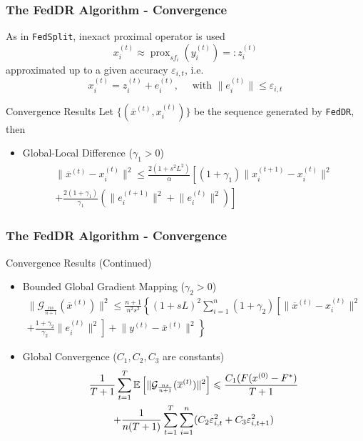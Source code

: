 \begin{frame}
\frametitle{The FedDR Algorithm - Convergence}

As in \texttt{FedSplit}, inexact proximal operator is used
$$x_i^{(t)} \approx \operatorname{prox}_{sf_i}(y_i^{(t)}) =: z_i^{(t)}$$
approximated up to a given accuracy $\varepsilon_{i,t}$, i.e.
$$x_i^{(t)} = z_i^{(t)} + e_i^{(t)}, \quad \text{ with } \lVert e_i^{(t)} \rVert \leqslant \varepsilon_{i,t}$$

\begin{block}{Convergence Results}
Let $\{ (\overline{x}^{(t)}, x_i^{(t)}) \}$ be the sequence generated by \texttt{FedDR}, then
\begin{itemize}
    \item Global-Local Difference ($\gamma_1 > 0$)
    {\smaller[2]
    \begin{multline*}
    \lVert \overline{x}^{(t)} - x_i^{(t)} \rVert^2 \leqslant \frac{2(1+s^2L^2)}{\alpha} \left[ (1+\gamma_1) \lVert x_i^{(t+1)} - x_i^{(t)} \rVert^2 \right. \\
    \left. + \frac{2(1+\gamma_1)}{\gamma_1}(\lVert e_i^{(t+1)} \rVert^2 + \lVert e_i^{(t)} \rVert^2) \right]
    \end{multline*}
    }
\end{itemize}
\end{block}

\end{frame}


\begin{frame}
\frametitle{The FedDR Algorithm - Convergence}

\begin{block}{Convergence Results (Continued)}
\begin{itemize}
    \item Bounded Global Gradient Mapping ($\gamma_2 > 0$)
    {\smaller[2]
    \begin{multline*}
    \lVert \mathcal{G}_{\frac{ns}{n+1}} (\overline{x}^{(t)}) \rVert^2 \leqslant \frac{n+1}{n^2s^2} \left\{ (1+sL)^2 \sum_{i=1}^n (1+\gamma_2) \left[ \lVert \overline{x}^{(t)} - x_i^{(t)} \rVert^2 \right. \right. \\
    \left. \left. + \frac{1+\gamma_2}{\gamma_2} \lVert e_i^{(t)} \rVert^2 \right] + \lVert y^{(t)} - \overline{x}^{(t)} \rVert^2 \right\}
    \end{multline*}
    }
    \item {\color{red}Global Convergence} ($C_1,C_2,C_3$ are constants)
    {\smaller[2]
    \begin{multline*}
    \dfrac{1}{T+1} \sum_{t=1}^T \operatorname*{\mathbb{E}} \left[ \lVert \mathcal{G}_{\frac{ns}{n+1}} (\overline{x}^{(t)}) \rVert^2 \right] \leqslant \frac{C_1(F(x^{(0)} - F^*)}{T+1} \\
    + \frac{1}{n(T+1)} \sum_{t=1}^T \sum_{i=1}^n (C_2 \varepsilon_{i,t}^2 + C_3 \varepsilon_{i,t+1}^2)
    \end{multline*}
    }
\end{itemize}
\end{block}

\end{frame}

